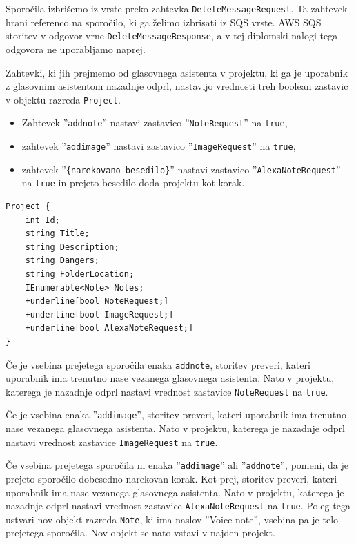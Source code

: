 \documentclass[a4paper, 12pt]{book}
\begin{document}
Sporočila izbrišemo iz vrste preko zahtevka \texttt{DeleteMessageRequest}.
Ta zahtevek hrani referenco na sporočilo, ki ga želimo izbrisati iz SQS vrste.
AWS SQS storitev v odgovor vrne \texttt{DeleteMessageResponse}, a v tej diplomski nalogi tega odgovora ne uporabljamo naprej.

Zahtevki, ki jih prejmemo od glasovnega asistenta v projektu, ki ga je uporabnik z glasovnim asistentom nazadnje odprl, nastavijo vrednosti treh boolean zastavic v objektu razreda \texttt{Project}.
\begin{itemize}
	\item Zahtevek ''\texttt{addnote}'' nastavi zastavico ''\texttt{NoteRequest}'' na \texttt{true},
	\item zahtevek ''\texttt{addimage}'' nastavi zastavico ''\texttt{ImageRequest}'' na \texttt{true},
	\item zahtevek ''\texttt{\{narekovano besedilo\}}'' nastavi zastavico ''\texttt{AlexaNoteRequest}'' na \texttt{true} in prejeto besedilo doda projektu kot korak.
\end{itemize}

\begin{Verbatim}[commandchars=+\[\]]
Project { 
    int Id; 
    string Title; 
    string Description; 
    string Dangers; 
    string FolderLocation; 
    IEnumerable<Note> Notes; 
    +underline[bool NoteRequest;] 
    +underline[bool ImageRequest;] 
    +underline[bool AlexaNoteRequest;] 
}
\end{Verbatim}


Če je vsebina prejetega sporočila enaka \texttt{addnote}, storitev preveri, kateri uporabnik ima trenutno nase vezanega glasovnega asistenta.
Nato v projektu, katerega je nazadnje odprl nastavi vrednost zastavice \texttt{NoteRequest} na \texttt{true}.


Če je vsebina enaka ''\texttt{addimage}'', storitev preveri, kateri uporabnik ima trenutno nase vezanega glasovnega asistenta.
Nato v projektu, katerega je nazadnje odprl nastavi vrednost zastavice \texttt{ImageRequest} na \texttt{true}.

Če vsebina prejetega sporočila ni enaka ''\texttt{addimage}'' ali ''\texttt{addnote}'', pomeni, da je prejeto sporočilo dobesedno narekovan korak.
Kot prej, storitev preveri, kateri uporabnik ima nase vezanega glasovnega asistenta.
Nato v projektu, katerega je nazadnje odprl nastavi vrednost zastavice \texttt{AlexaNoteRequest} na \texttt{true}.
Poleg tega ustvari nov objekt razreda \texttt{Note}, ki ima naslov ''Voice note'', vsebina pa je telo prejetega sporočila.
Nov objekt se nato vstavi v najden projekt.
\end{document}
